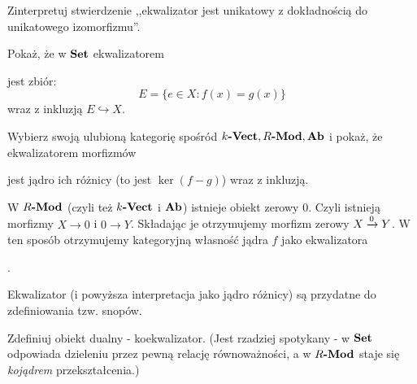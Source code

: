 \begin{exc}
  Zinterpretuj stwierdzenie ,,ekwalizator jest unikatowy z dokładnością do unikatowego izomorfizmu''.
\end{exc}

\begin{exc}
  Pokaż, że w $\Set$ ekwalizatorem  jest zbiór:
    $$E = \{e\in X : f(x) = g(x) \}$$
  wraz z inkluzją $E\hookrightarrow X$.
\end{exc}

\begin{exc}
  Wybierz swoją ulubioną kategorię spośród $\Vect k, \Mod R, \Ab$ i pokaż, że ekwalizatorem morfizmów  jest jądro ich różnicy (to jest $\ker (f-g)$) wraz z inkluzją.
\end{exc}

\begin{remk}[\starred]
    W $\Mod R$ (czyli też $\Vect k$ i $\Ab$) istnieje obiekt zerowy $0$. Czyli istnieją morfizmy $X\to 0$ i $0\to Y$. Składając je otrzymujemy morfizm zerowy $\morpharr 0 X Y$. W ten sposób otrzymujemy kategoryjną własność jądra $f$ jako ekwalizatora .
\end{remk}

\begin{remk}[\starred]
  Ekwalizator (i powyższa interpretacja jako jądro różnicy) są przydatne do zdefiniowania tzw. snopów.
\end{remk}

\begin{exc}
  Zdefiniuj obiekt dualny - koekwalizator. (Jest rzadziej spotykany - w $\Set$ odpowiada dzieleniu przez pewną relację równoważności, a w $\Mod R$ staje się \emph{kojądrem} przekształcenia.)
\end{exc}

